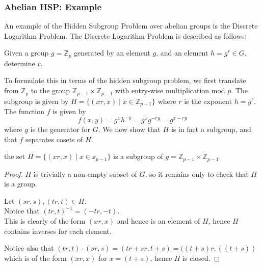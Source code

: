 \documentclass{beamer}
\newcommand{\bb}[1]{\mathbb{#1}}
\begin{document}
\begin{frame}
\frametitle{Abelian HSP: Example}
        An example of the Hidden Subgroup Problem over abelian groups is the Discrete Logarithm Problem.
        The Discrete Logarithm Problem is described as follows:
        \begin{problem}\label{problem:dlp}
            Given a group $g = \bb{Z}_p$ generated by an element $g$, and an element $h = g^r \in G$, determine $r$.
        \end{problem}

        To formulate this in terms of the hidden subgroup problem, we first translate from $\bb{Z}_p$ to the group $\bb{Z}_{p-1} \times \bb{Z}_{p-1}$ with entry-wise multiplication mod $p$.
        The subgroup is given by $H = \{(xr, x) \mid x \in \bb{Z}_{p-1}\}$ where $r$ is the exponent $h = g^r$.
        The function $f$ is given by 
            $$f(x, y) = g^x h^{-y} = g^x g^{-ry} = g^{x - ry}$$ 
        where $g$ is the generator for $G$.
        We now show that $H$ is in fact a subgroup, and that $f$ separates cosets of $H$.
        \begin{theorem}
            the set $H = \{(xr, x) \mid x \in \bb{z}_{p - 1}\}$ is a subgroup of $g = \bb{Z}_{p-1} \times \bb{Z}_{p-1}$.
        \end{theorem}
        \begin{proof}
            $H$ is trivially a non-empty subset of $G$, so it remains only to check that $H$ is a group.

            Let $(sr, s), (tr, t) \in H$.\\
            Notice that $(tr, t)^{-1} = (-tr, -t)$.\\
            This is clearly of the form $(xr, x)$ and hence is an element of $H$, hence $H$ contains inverses for each element.

            Notice also that $(tr, t) \cdot (sr, s) = (tr + sr, t + s) = ((t + s)r, ((t + s))$ which is of the form $(xr, x)$ for $x = (t + s)$, hence $H$ is closed.


\end{proof}
\end{frame}
\end{document}
